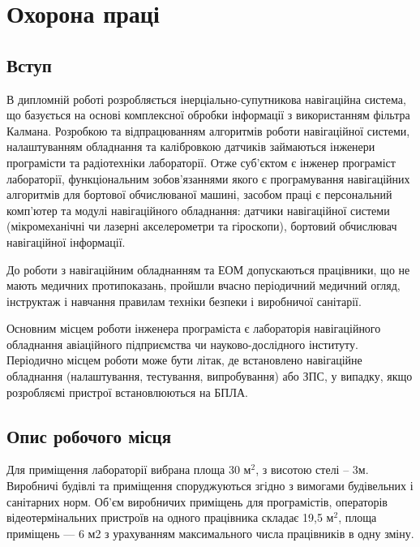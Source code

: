 \documentclass[ukrainian,utf8,simple,floatsubsection, hpadding=5mm,equationsubsection,]{eskdtext}
\begin{document}




\section{Охорона праці}
\subsection{Вступ}

В дипломній роботі розробляється інерціально-супутникова навігаційна система, що базується на основі комплексної обробки інформації з використанням фільтра Калмана. Розробкою та відпрацюванням алгоритмів роботи навігаційної системи, налаштуванням обладнання та калібровкою датчиків займаються інженери програмісти та радіотехніки лабораторії. Отже суб’єктом є інженер програміст лабораторії, функціональним зобов'язаннями якого є програмування навігаційних алгоритмів для бортової обчислюваної машині, засобом праці є персональний комп'ютер та модулі навігаційного обладнання: датчики навігаційної системи (мікромеханічні чи лазерні акселерометри та гіроскопи), бортовий обчислювач навігаційної інформації.

До роботи з навігаційним обладнанням та ЕОМ допускаються працівники, що не мають медичних протипоказань, пройшли вчасно періодичний медичний огляд, інструктаж і навчання  правилам техніки безпеки і виробничої санітарії.

Основним місцем роботи інженера програміста є лабораторія навігаційного обладнання авіаційного підприємства чи науково-дослідного інституту. Періодично місцем роботи може бути літак, де встановлено навігаційне обладнання (налаштування, тестування, випробування) або ЗПС, у випадку, якщо розробляємі пристрої встановлюються на БПЛА.

\subsection{Опис робочого місця}
Для приміщення лабораторії вибрана площа 30 $\text{м}^2$, з висотою стелі -- 3м. Виробничі будівлі та приміщення споруджуються згідно з вимогами будівельних і санітарних норм. Об’єм виробничих приміщень для програмістів, операторів відеотермінальних пристроїв на одного працівника складає 19,5 $\text{м}^2$, площа приміщень — 6 м2 з урахуванням максимального числа працівників в одну зміну. 
\end{document}
